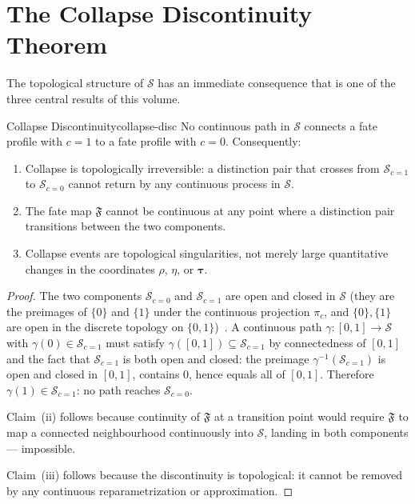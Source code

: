 \documentclass[12pt,twoside,openright]{book}
\newcommand{\fateMap}{\mathfrak{F}}
\newcommand{\fateSpace}{\mathcal{S}}
\newcommand{\survRatio}{\rho}             %
\newcommand{\repEff}{\eta}               %
\newcommand{\collapseInd}{c}             %
\newcommand{\fateComp}[1]{\fateSpace_{\collapseInd=#1}}
\providecommand{\fateComp}[1]{\fateSpace_{\collapseInd=#1}}
\begin{document}
\section{The Collapse Discontinuity Theorem}

The topological structure of $\fateSpace$ has an immediate
consequence that is one of the three central results of this
volume.

\begin{metatheorem}{Collapse Discontinuity}{collapse-disc}
No continuous path in $\fateSpace$ connects a fate profile
with $\collapseInd=1$ to a fate profile with $\collapseInd=0$.
Consequently:
\begin{enumerate}[nosep,label=(\roman*)]
  \item Collapse is topologically irreversible: a distinction
    pair that crosses from $\fateComp{1}$ to $\fateComp{0}$
    cannot return by any continuous process in $\fateSpace$.
  \item The fate map $\fateMap$ cannot be continuous at any
    point where a distinction pair transitions between the
    two components.
  \item Collapse events are topological singularities, not
    merely large quantitative changes in the coordinates
    $\survRatio$, $\repEff$, or $\boldsymbol{\tau}$.
\end{enumerate}
\begin{proof}
The two components $\fateComp{0}$ and $\fateComp{1}$ are
open and closed in $\fateSpace$ (they are the preimages of
$\{0\}$ and $\{1\}$ under the continuous projection
$\pi_c$, and $\{0\},\{1\}$ are open in the discrete topology
on $\{0,1\}$)~\cite{munkres2000}. A continuous path $\gamma:[0,1]\to\fateSpace$
with $\gamma(0)\in\fateComp{1}$ must satisfy
$\gamma([0,1])\subseteq\fateComp{1}$ by connectedness of
$[0,1]$ and the fact that $\fateComp{1}$ is both open and
closed: the preimage $\gamma^{-1}(\fateComp{1})$ is open
and closed in $[0,1]$, contains $0$, hence equals all of
$[0,1]$. Therefore $\gamma(1)\in\fateComp{1}$: no path
reaches $\fateComp{0}$.

Claim~(ii) follows because continuity of $\fateMap$ at a
transition point would require $\fateMap$ to map a connected
neighbourhood continuously into $\fateSpace$, landing in both
components --- impossible.

Claim~(iii) follows because the discontinuity is topological:
it cannot be removed by any continuous reparametrization or
approximation.
\end{proof}
\end{metatheorem}
\end{document}

